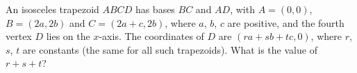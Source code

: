 An isosceles trapezoid $ABCD$ has bases $BC$ and $AD$, with $A=(0,0)$, $B=(2a,2b)$ and $C=(2a+c,2b)$, where $a$, $b$, $c$ are positive, and the fourth vertex $D$ lies on the $x$-axis. The coordinates of $D$ are $(ra+sb+tc,0)$, where $r$, $s$, $t$ are constants (the same for all such trapezoids). What is the value of $r+s+t$?

